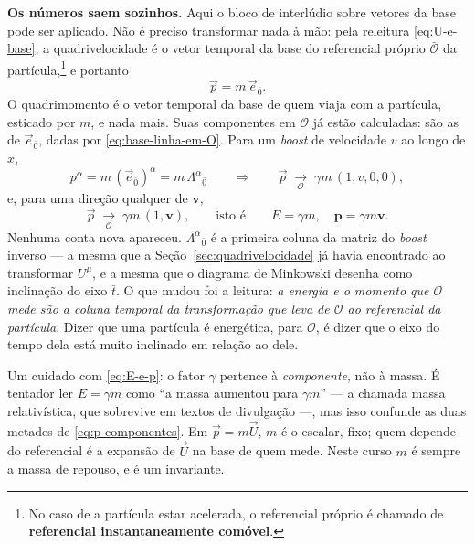 \documentclass[12pt,a4paper,oneside]{book}
\theoremstyle{rgplain}
\theoremstyle{rgremark}
\newcommand{\obs}{\mathcal{O}}
\newcommand{\obsl}{\bar{\mathcal{O}}}
\newcommand{\temcomp}[1]{\;\underset{#1}{\longrightarrow}\;}
\begin{document}
\textbf{Os números saem sozinhos.} Aqui o bloco de interlúdio sobre
vetores da base pode ser aplicado. Não é preciso
transformar nada à mão: pela releitura \eqref{eq:U-e-base}, a quadrivelocidade
é o vetor temporal da base do referencial próprio $\obsl$ da
partícula,\footnote{No caso de a partícula estar acelerada, o referencial
próprio é chamado de \textbf{referencial instantaneamente comóvel}.} e portanto
\begin{equation}
  \vec p=m\,\vec e_{\bar 0} .
  \label{eq:p-base}
\end{equation}
O quadrimomento é o vetor temporal da base de quem viaja com a partícula,
esticado por $m$, e nada mais. Suas componentes em $\obs$ já estão calculadas:
são as de $\vec e_{\bar 0}$, dadas por \eqref{eq:base-linha-em-O}. Para um
\emph{boost} de velocidade $v$ ao longo de $x$,
\begin{equation}
  p^{\alpha}=m\,(\vec e_{\bar 0})^{\alpha}=m\,\Lambda^{\alpha}{}_{\bar 0}
  \qquad\Longrightarrow\qquad
  \vec p\temcomp{\obs}\gamma m\,(1,v,0,0),
  \label{eq:p-componentes-boost}
\end{equation}
e, para uma direção qualquer de $\bm v$,
\begin{equation}
  \vec p\temcomp{\obs}\gamma m\,(1,\bm v),
  \qquad\text{isto é}\qquad
  E=\gamma m,\quad \bm p=\gamma m\bm v .
  \label{eq:E-e-p}
\end{equation}
Nenhuma conta nova apareceu. $\Lambda^{\alpha}{}_{\bar 0}$ é a primeira coluna da
matriz do \emph{boost} inverso --- a mesma que a Seção~\ref{sec:quadrivelocidade}
já havia encontrado ao transformar $U^\mu$, e a mesma que o diagrama de
Minkowski desenha como inclinação do eixo $\bar t$. O que mudou foi a leitura:
\emph{a energia e o momento que $\obs$ mede são a coluna temporal da
transformação que leva de $\obs$ ao referencial da partícula}. Dizer que uma
partícula é energética, para $\obs$, é dizer que o eixo do tempo dela está
muito inclinado em relação ao dele.

\begin{atencao}
Um cuidado com \eqref{eq:E-e-p}: o fator $\gamma$ pertence à \emph{componente},
não à massa. É tentador ler $E=\gamma m$ como ``a massa aumentou para $\gamma
m$'' --- a chamada massa relativística, que sobrevive em textos de divulgação
---, mas isso confunde as duas metades de \eqref{eq:p-componentes}. Em
$\vec p=m\vec U$, $m$ é o escalar, fixo; quem depende do referencial é a
expansão de $\vec U$ na base de quem mede. Neste curso $m$ é sempre a massa de
repouso, e é um invariante.
\end{atencao}
\end{document}
